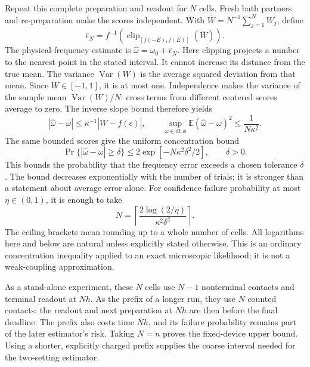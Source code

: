\documentclass[11pt,a4paper]{article}
\numberwithin{equation}{section}
\theoremstyle{remark}
\begin{document}
Repeat this complete preparation and readout for $N$ cells. Fresh bath
partners and re-preparation make the scores independent. With
$\overline W=N^{-1}\sum_{j=1}^NW_j$, define
\begin{equation}
 \widehat\epsilon_N=
 f^{-1}\!\left(\operatorname{clip}_{[f(-E),f(E)]}
                          (\overline W)\right).
 \label{micro:calibestimator}
\end{equation}
The physical-frequency estimate is $\widehat\omega=\omega_0+\widehat\epsilon_N$.
Here clipping projects a number to the nearest point in the stated
interval. It cannot increase its distance from the true mean. The
variance $\operatorname{Var}(W)$ is the average squared deviation from
that mean. Since $W\in[-1,1]$, it is at most one. Independence makes the
variance of the sample mean $\operatorname{Var}(W)/N$: cross terms from
different centered scores average to zero. The inverse slope bound therefore
yields
\begin{equation}
 |\widehat\omega-\omega|
 \le\kappa^{-1}|\overline W-f(\epsilon)|,
 \qquad
 \sup_{\omega\in\Omega,\phi}
 \mathbb E(\widehat\omega-\omega)^2
 \le\frac1{N\kappa^2}.
 \label{micro:calibrisk}
\end{equation}
The same bounded scores give the uniform concentration bound
\begin{equation}
 \Pr\{|\widehat\omega-\omega|\ge\delta\}
 \le2\exp[-N\kappa^2\delta^2/2],\qquad\delta>0.
 \label{micro:calibtail}
\end{equation}
This bounds the probability that the frequency error exceeds a chosen
tolerance $\delta$. The bound decreases exponentially with the number of
trials; it is stronger than a statement about average error alone.
For confidence failure probability at most $\eta\in(0,1)$, it is enough
to take
\begin{equation}
 N=\left\lceil\frac{2\log(2/\eta)}{\kappa^2\delta^2}\right\rceil.
 \label{micro:calibcost}
\end{equation}
The ceiling brackets mean rounding up to a whole number of cells.
All logarithms here and below are natural unless explicitly stated
otherwise. This is an ordinary concentration inequality applied to an
exact microscopic likelihood; it is not a weak-coupling approximation.

As a stand-alone experiment, these $N$ cells use $N-1$ nonterminal
contacts and terminal readout at $Nh$. As the prefix of a longer run,
they use $N$ counted contacts: the readout and next preparation at $Nh$
are then before the final deadline. The prefix also costs time $Nh$,
and its failure probability remains part of the later estimator's risk.
Taking $N=n$ proves the fixed-device upper bound. Using a shorter,
explicitly charged prefix supplies the coarse interval needed for the
two-setting estimator.
\end{document}
